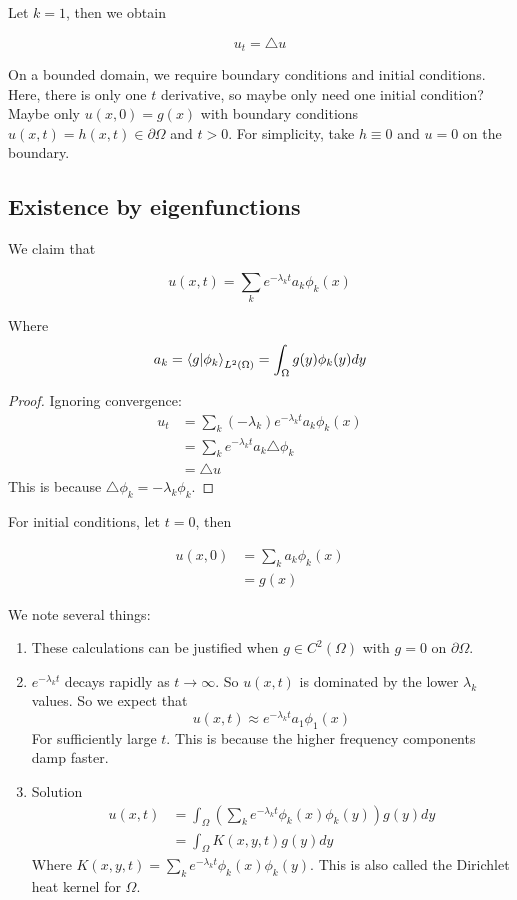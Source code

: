 \documentclass{article}
\newtheorem{one minute paper}[theorem]{One Minute Paper}
\begin{document}
Let $k=1$, then we obtain 

\begin{equation}
    u_t = \triangle u
\end{equation}

On a bounded domain, we require boundary conditions and initial conditions. Here, there is only one $t$ derivative, so maybe only need one initial condition? Maybe only $u(x,0) = g(x)$ with boundary conditions $u(x,t) = h(x,t) \in \partial \Omega$ and $t> 0$. 
For simplicity, take $h \equiv 0$ and $u = 0$ on the boundary. 

\subsection*{Existence by eigenfunctions}

We claim that 

\begin{equation}
    u(x,t) = \sum_k e^{-\lambda_k t}a_k\phi_k(x)
\end{equation}

Where $$a_k = \braket{g}{\phi_k}_{L^2(\Omega)} = \int_\Omega g(y)\phi_k(y)dy$$

\begin{proof}
    Ignoring convergence:
    \begin{align*}
        u_t &= \sum_k \left( -\lambda_k \right)e^{-\lambda_k t}a_k \phi_k(x) \\
        &= \sum_k e^{-\lambda_k t}a_k \triangle \phi_k \\
        &= \triangle u
    \end{align*}
    This is because $\triangle \phi_k = -\lambda_k \phi_k$. 
\end{proof}

For initial conditions, let $t=0$, then

\begin{align*}
    u(x,0) &= \sum_k a_k \phi_k(x) \\
    &= g(x)
\end{align*}

We note several things:
\begin{enumerate}
    \item These calculations can be justified when $g \in C^2(\Omega)$ with $g=0$ on $\partial \Omega$.
    \item $e^{-\lambda_k t}$ decays rapidly as $t \rightarrow \infty$. So $u(x,t)$ is dominated by the lower $\lambda_k$ values. So we expect that 
    \begin{equation}
        u(x,t) \approx e^{-\lambda_kt}a_1\phi_1(x)
    \end{equation}
    For sufficiently large $t$. This is because the higher frequency components damp faster. 
    \item Solution 
    \begin{align*}
        u(x,t) &= \int_\Omega\left( \sum_k e^{-\lambda_k t}\phi_k(x)\phi_k(y) \right)g(y)dy \\
        &= \int_\Omega K(x,y,t)g(y)dy
    \end{align*}
    Where $K(x,y,t) = \sum_k e^{-\lambda_k t}\phi_k(x)\phi_k(y)$. This is also called the Dirichlet heat kernel for $\Omega$. 
\end{enumerate}
\end{document}
